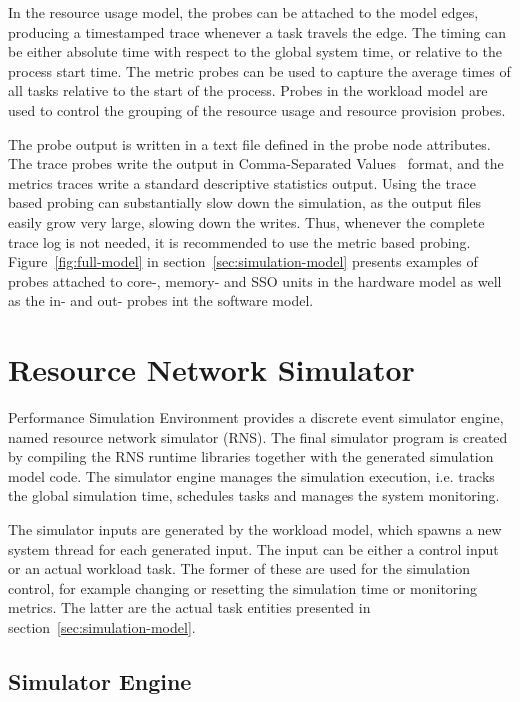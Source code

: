 In the resource usage model, the probes can be attached to the model edges, producing a timestamped trace whenever a task travels the edge. The timing can be either absolute time with respect to the global system time, or relative to the process start time. The metric probes can be used to capture the average times of all tasks relative to the start of the process. Probes in the workload model are used to control the grouping of the resource usage and resource provision probes.

The probe output is written in a text file defined in the probe node attributes. The trace probes write the output in Comma-Separated Values~\cite{Shafranovic:2005:CSV} format, and the metrics traces write a standard descriptive statistics output. Using the trace based probing can substantially slow down the simulation, as the output files easily grow very large, slowing down the writes. Thus, whenever the complete trace log is not needed, it is recommended to use the metric based probing. Figure~\ref{fig:full-model} in section~\ref{sec:simulation-model} presents examples of probes attached to core-, memory- and SSO units in the hardware model as well as the in- and out- probes int the software model.

\section{Resource Network Simulator}
\label{sec:resource-network-simulator}

Performance Simulation Environment provides a discrete event simulator engine, named resource network simulator (RNS). The final simulator program is created by compiling the RNS runtime libraries together with the generated simulation model code. The simulator engine manages the simulation execution, i.e. tracks the global simulation time, schedules tasks and manages the system monitoring.

The simulator inputs are generated by the workload model, which spawns a new system thread for each generated input. The input can be either a control input or an actual workload task. The former of these are used for the simulation control, for example changing or resetting the simulation time or monitoring metrics. The latter are the actual task entities presented in section~\ref{sec:simulation-model}.

\subsection{Simulator Engine}
\label{sec:simulator-engine}

